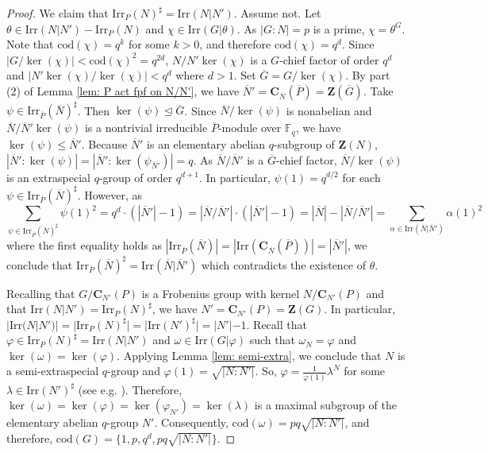 \documentclass[9pt]{article}
\begin{document}
\begin{proof}
We claim that $\mathrm{Irr}_P(N)^\sharp=\mathrm{Irr}(N|N')$.
	Assume not. 
	Let $\theta\in \mathrm{Irr}(N|N')-\mathrm{Irr}_P(N)$ and $\chi \in \mathrm{Irr}(G|\theta)$.
	As $|G:N|=p$ is a prime, $\chi=\theta^{G}$.
	Note that $\mathrm{cod}(\chi)=q^{k}$ for some $k>0$,
	and therefore $\mathrm{cod}(\chi)=q^{d}$.
	Since $|G/\ker(\chi)|<\mathrm{cod}(\chi)^{2}=q^{2d}$,
	$N/N'\ker(\chi)$ is a $G$-chief factor of order $q^{d}$
	and $|N'\ker(\chi)/\ker(\chi)|<q^{d}$ where $d>1$.
	Set $\overline{G}=G/\ker(\chi)$.
	By part (2) of Lemma \ref{lem: P act fpf on N/N'}, we have $\overline{N}'=\mathbf{C}_{\overline{N}}(\overline{P})=\mathbf{Z}(\overline{G})$.
	Take $\psi\in \mathrm{Irr}_{\overline{P}}(\overline{N})^\sharp$.
	Then $\ker(\psi)\unlhd\overline{G}$.
	Since $\overline{N}/\ker(\psi)$ is nonabelian
	and $\overline{N}/\overline{N}'\ker(\psi)$ is a nontrivial irreducible $\overline{P}$-module over $\mathbb{F}_q$,
	we have $\ker(\psi)\leq \overline{N}'$.
    Because $\overline{N}'$ is an elementary abelian $q$-subgroup of $\mathbf{Z}(N)$, 
	$|\overline{N}':\ker(\psi)|=|\overline{N}':\ker(\psi_{\overline{N}'})|=q$.
    As $\overline{N}/\overline{N}'$ is a $\overline{G}$-chief factor,
	$\overline{N}/\ker(\psi)$ is an extraspecial $q$-group of order $q^{d+1}$.
	In particular, $\psi(1)=q^{d/2}$ for each $\psi \in \mathrm{Irr}_{\overline{P}}(\overline{N})^\sharp$.
	However, as 
   $$\sum_{\psi\in \mathrm{Irr}_{\overline{P}}(\overline{N})^\sharp}\psi(1)^{2}=q^{d}\cdot (|\overline{N}'|-1)=|\overline{N}/\overline{N}'|\cdot (|\overline{N}'|-1)=|\overline{N}|-|\overline{N}/\overline{N}'|=\sum_{\alpha \in \mathrm{Irr}(\overline{N}|\overline{N}')}\alpha(1)^{2}$$
   where the first equality holds as $|\mathrm{Irr}_{\overline{P}}(\overline{N})|=|\mathrm{Irr}(\mathbf{C}_{\overline{N}}(\overline{P}))|=|\overline{N}'|$,
   we conclude that $\mathrm{Irr}_{\overline{P}}(\overline{N})^\sharp=\mathrm{Irr}(\overline{N}|\overline{N}')$ which contradicts the existence of $\theta$.




 Recalling that $G/\mathbf{C}_{N'}(P)$ is a Frobenius group with kernel $N/\mathbf{C}_{N'}(P)$
   and that $\mathrm{Irr}(N|N')=\mathrm{Irr}_P(N)^\sharp$,
   we have $N'=\mathbf{C}_{N'}(P)=\mathbf{Z}(G)$.
   In particular, $|\mathrm{Irr}(N|N')|=|\mathrm{Irr}_P(N)^\sharp|=|\mathrm{Irr}(N')^\sharp|=|N'|-1$.
   Recall that $\varphi \in \mathrm{Irr}_P(N)^\sharp=\mathrm{Irr}(N|N')$ and $\omega\in \mathrm{Irr}(G|\varphi)$ such that $\omega_N=\varphi$ and $\ker(\omega)=\ker(\varphi)$.
   Applying Lemma \ref{lem: semi-extra},
   we conclude that $N$ is a semi-extraspecial $q$-group and $\varphi(1)=\sqrt{|N:N'|}$.
   So, $\varphi=\frac{1}{\varphi(1)}\lambda^N$ for some $\lambda\in \mathrm{Irr}(N')^\sharp$ (see e.g.  \cite[Problem 6.3]{isaacs1994}). 
   Therefore, $\ker(\omega)=\ker(\varphi)=\ker(\varphi_{N'})=\ker(\lambda)$ is a maximal subgroup 
   of the elementary abelian $q$-group $N'$.
   Consequently, $\mathrm{cod}(\omega)=pq \sqrt{|N:N'|}$,
   and therefore, $\mathrm{cod}(G)=\{ 1,p,q^{d}, pq \sqrt{|N:N'|} \}$.
\end{proof}
\end{document}
